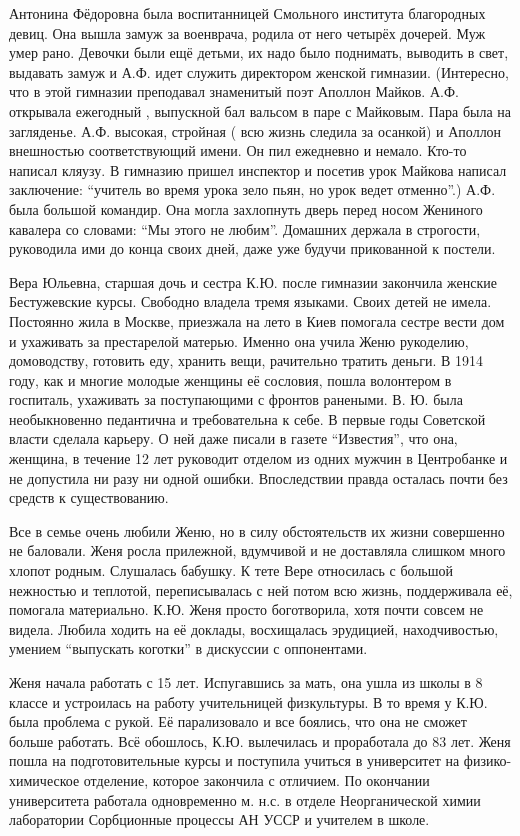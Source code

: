 Антонина Фёдоровна была воспитанницей Смольного института благородных девиц. Она вышла замуж за военврача, родила от него четырёх дочерей. Муж умер рано. Девочки были ещё детьми, их надо было поднимать, выводить в свет, выдавать замуж и А.Ф. идет служить директором женской гимназии. (Интересно, что в этой гимназии преподавал знаменитый поэт Аполлон Майков. А.Ф. открывала ежегодный , выпускной бал вальсом в паре с Майковым. Пара была на загляденье. А.Ф. высокая, стройная ( всю жизнь следила за осанкой) и Аполлон внешностью соответствующий имени. Он пил ежедневно и немало. Кто-то написал кляузу. В гимназию пришел инспектор и посетив урок Майкова написал заключение: “учитель во время урока зело пьян, но урок ведет отменно”.) А.Ф. была большой командир. Она могла захлопнуть дверь перед носом Жениного кавалера со словами: “Мы этого не любим”. Домашних держала в строгости, руководила ими до конца своих дней, даже уже будучи прикованной к постели.

Вера Юльевна, старшая дочь и сестра К.Ю. после гимназии закончила женские Бестужевские курсы. Свободно владела тремя языками. Своих детей не имела. Постоянно жила в Москве, приезжала на лето в Киев помогала сестре вести дом и ухаживать за престарелой матерью. Именно она учила Женю рукоделию, домоводству, готовить еду, хранить вещи, рачительно тратить деньги. В 1914 году, как и многие молодые женщины её сословия, пошла волонтером в госпиталь, ухаживать за поступающими с фронтов ранеными. В. Ю. была необыкновенно педантична и требовательна к себе. В первые годы Советской власти сделала карьеру. О ней даже писали в газете “Известия”, что она, женщина, в течение 12 лет руководит отделом из одних мужчин в Центробанке и не допустила ни разу ни одной ошибки. Впоследствии правда осталась почти без средств к существованию.

Все в семье очень любили Женю, но в силу обстоятельств их жизни совершенно не баловали. Женя росла прилежной, вдумчивой и не доставляла слишком много хлопот родным. Слушалась бабушку. К тете Вере относилась с большой нежностью и теплотой, переписывалась с ней потом всю жизнь, поддерживала её, помогала материально. К.Ю. Женя просто боготворила, хотя почти совсем не видела. Любила ходить на её доклады, восхищалась эрудицией, находчивостью, умением “выпускать коготки” в дискуссии с оппонентами.

Женя начала работать с 15 лет. Испугавшись за мать, она ушла из школы в 8 классе и устроилась на работу учительницей физкультуры. В то время у К.Ю. была проблема с рукой. Её парализовало и все боялись, что она не сможет больше работать. Всё обошлось, К.Ю. вылечилась и проработала до 83 лет. Женя пошла на подготовительные курсы и поступила учиться в университет на физико-химическое отделение, которое закончила с отличием. По окончании университета работала одновременно м. н.с. в отделе Неорганической химии лаборатории Сорбционные процессы АН УССР и учителем в школе.

